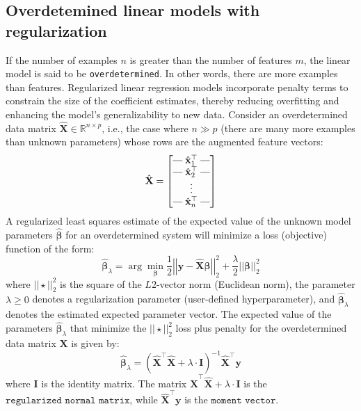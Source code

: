 \documentclass{article}[11pt]
\makeatletter
\newcommand{\brows}[1]{%
  \begin{bmatrix}
  \begin{array}{@{\protect\rotvert\;}c@{\;\protect\rotvert}}
  #1
  \end{array}
  \end{bmatrix}
}
\newcommand{\rotvert}{\rotatebox[origin=c]{90}{$\vert$}}
\newcommand{\rowsvdots}{\multicolumn{1}{@{}c@{}}{\vdots}}
\newcommand{\norm}[1]{\left|\left|#1\right|\right|}
\makeatother
\begin{document}
\subsection{Overdetemined linear models with regularization}
If the number of examples $n$ is greater than the number of features $m$, the linear model is said to be \texttt{overdetermined}.
In other words, there are more examples than features.  Regularized linear regression models incorporate penalty terms to constrain the size of the coefficient estimates, 
thereby reducing overfitting and enhancing the model's generalizability to new data. 
Consider an overdetermined data matrix $\hat{\mathbf{X}}\in\mathbb{R}^{n\times{p}}$, i.e., the case where $n\gg{p}$ (there are many more examples than unknown parameters)
whose rows are the augmented feature vectors:
\begin{equation*}
\hat{\mathbf{X}} = 
    \brows{\hat{\mathbf{x}}_1^\top \\ \hat{\mathbf{x}}_2^\top \\ \rowsvdots \\ \hat{\mathbf{x}}_n^\top}
\end{equation*}
A regularized least squares estimate of the expected value of the unknown model parameters $\hat{\mathbf{\beta}}$ for an overdetermined system will minimize a loss (objective) function of the form:
\begin{equation}\label{eq:regressionloss-regularization-L2}
\hat{\mathbf{\beta}}_{\lambda} = \arg\min_{\mathbf{\beta}} \frac{1}{2}\norm{\mathbf{y} - \hat{\mathbf{X}}\mathbf{\beta}}^{2}_{2} + 
\frac{\lambda}{2}\norm{\mathbf{\beta}}^{2}_{2}
\end{equation}
where $||\star||^{2}_{2}$ is the square of the $L2$-vector norm (Euclidean norm), the parameter
$\lambda\geq{0}$ denotes a regularization parameter (user-defined hyperparameter), 
and $\hat{\mathbf{\beta}}_{\lambda}$ denotes the estimated expected parameter vector. 
The expected value of the parameters $\hat{\mathbf{\beta}}_{\lambda}$ that minimize the $||\star||^{2}_{2}$ loss plus penalty for the overdetermined data matrix $\mathbf{X}$ is given by:
\begin{equation*}
\hat{\mathbf{\beta}}_{\lambda} = \left(\hat{\mathbf{X}}^{\top}\hat{\mathbf{X}}+\lambda\cdot\mathbf{I}\right)^{-1}\hat{\mathbf{X}}^{\top}\mathbf{y}
\end{equation*}
where $\mathbf{I}$ is the identity matrix.
The matrix $\hat{\mathbf{X}}^{\top}\hat{\mathbf{X}}+\lambda\cdot\mathbf{I}$ is the $\texttt{regularized normal matrix}$, while $\hat{\mathbf{X}}^{\top}\mathbf{y}$ is the $\texttt{moment vector}$. 
\end{document}
